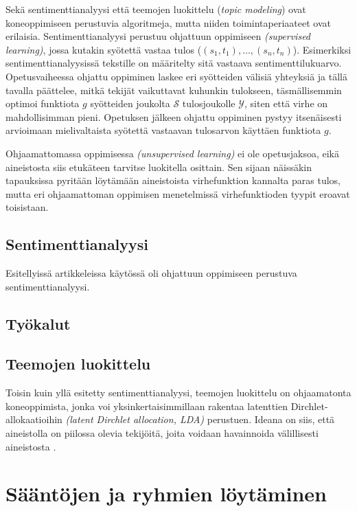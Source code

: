 \documentclass[finnish,gradu,twoside,12pt]{tktltiki}
\begin{document}
{Sekä sentimenttianalyysi että teemojen luokittelu (\textit{topic modeling}) ovat koneoppimiseen perustuvia algoritmeja, mutta niiden toimintaperiaateet ovat erilaisia. Sentimenttianalyysi perustuu ohjattuun oppimiseen \textit{(supervised learning)}, jossa kutakin syötettä vastaa tulos (${ (s_1, t_1), \ldots , (s_n, t_n) }$). Esimerkiksi sentimenttianalyysissä tekstille on määritelty sitä vastaava sentimenttilukuarvo. Opetusvaiheessa ohjattu oppiminen laskee eri syötteiden välisiä yhteyksiä ja tällä tavalla päättelee, mitkä tekijät vaikuttavat kuhunkin tulokseen, täsmällisemmin optimoi funktiota $g$ syötteiden joukolta $\mathcal{S}$ tulosjoukolle $\mathcal{Y}$, siten että virhe on mahdollisimman pieni. Opetuksen jälkeen ohjattu oppiminen pystyy itsenäisesti arvioimaan mielivaltaista syötettä vastaavan tulosarvon käyttäen funktiota $g$.

Ohjaamattomassa oppimisessa \textit{(unsupervised learning)} ei ole opetusjaksoa, eikä aineistosta siis etukäteen tarvitse luokitella osittain. Sen sijaan näissäkin tapauksissa pyritään löytämään aineistoista virhefunktion kannalta paras tulos, mutta eri ohjaamattoman oppimisen menetelmissä virhefunktioden tyypit eroavat toisistaan.

\subsection{Sentimenttianalyysi}

Esitellyissä artikkeleissa käytössä oli ohjattuun oppimiseen perustuva sentimenttianalyysi.

\subsection*{Työkalut}

\subsection{Teemojen luokittelu}

Toisin kuin yllä esitetty sentimenttianalyysi, teemojen luokittelu on ohjaamatonta koneoppimista, jonka voi yksinkertaisimmillaan rakentaa latenttien Dirchlet-allokaatioihin \textit{(latent Dirchlet allocation, LDA)} perustuen. Ideana on siis, että aineistolla on piilossa olevia tekijöitä, joita voidaan havainnoida välillisesti aineistosta \citep{Blei2010}. 

\section{Sääntöjen ja ryhmien löytäminen}
\label{unsupervised}

}
\end{document}
